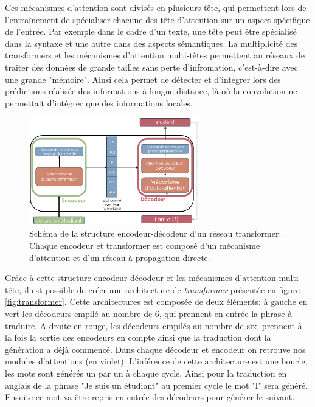 Ces mécanismes d'attention sont divisés en plusieurs tête, qui permettent lors de l'entraînement de spécialiser chacune des tête d'attention sur un aspect spécifique de l'entrée. Par exemple dans le cadre d'un texte, une tête peut être spécialisé dans la syntaxe et une autre dans des aspects sémantiques. 
La multiplicité des transformers et les mécanismes d'attention multi-têtes permettent au réseaux de traiter des données de grande tailles sans perte d'infromation, c'est-à-dire avec une grande "mémoire". Ainsi cela permet de détecter et d'intégrer lors des prédictions réalisée des informations à longue distance, là où la convolution ne permettait d'intégrer que des informations locales.
\begin{figure}[!htbp]
 \centering
 \includegraphics[width=0.66\textwidth]{figures/encoder_attention.png}
 \caption[Schéma de la structure encodeur-décodeur d'un réseau transformer]{Schéma de la structure encodeur-décodeur d'un réseau transformer. Chaque encodeur et transformer est composé d'un mécanisme d'attention et d'un réseau à propagation directe.}
 \label{fig:encoder_attention}
\end{figure}
Grâce à cette structure encodeur-décodeur et les mécanismes d'attention multi-tête, il est possible de créer une architecture de \textit{transformer} présentée en figure \ref{fig:transformer}. Cette architectures est composée de deux éléments: à gauche en vert les décodeurs empilé au nombre de 6, qui prennent en entrée la phrase à traduire. A droite en rouge, les décodeurs empilés au nombre de six, prennent à la fois la sortie des encodeurs en compte ainsi que la traduction dont la génération a déjà commencé. Dans chaque décodeur et encodeur on retrouve nos modules d'attentions (en violet). L'inférence de cette architecture est une boucle, les mots sont générés un par un à chaque cycle. Ainsi pour la traduction en anglais de la phrase "Je suis un étudiant" au premier cycle le mot "I" sera généré. Ensuite ce mot va être repris en entrée des décodeurs pour générer le suivant.
